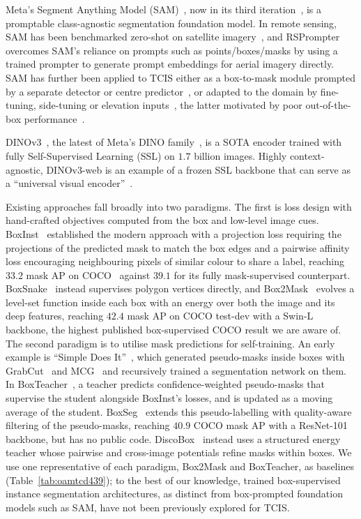 \documentclass[remotesensing,article,submit,moreauthors]{Definitions/mdpi}
\begin{document}
Meta's Segment Anything Model (SAM)~\cite{sam}, now in its third iteration~\cite{sam3}, is a promptable class-agnostic segmentation foundation model. In remote sensing, SAM has been benchmarked zero-shot on satellite imagery~\cite{ren2024space}, and RSPrompter~\cite{rsprompter} overcomes SAM's reliance on prompts such as points/boxes/masks by using a trained prompter to generate prompt embeddings for aerial imagery directly. 
SAM has further been applied to TCIS either as a box-to-mask module prompted by a separate detector or centre predictor~\cite{fmsam,chen2025zeroshot,treepseco}, or adapted to the domain by fine-tuning, side-tuning or elevation inputs~\cite{teng2025,treesam,ginkgo}, the latter motivated by poor out-of-the-box performance~\cite{teng2025,treesam}.


DINOv3~\cite{dinov3}, the latest of Meta's DINO family~\cite{dino,dinov2}, is a SOTA encoder trained with fully Self-Supervised Learning (SSL) on $1.7$ billion images. Highly context-agnostic, DINOv3-web is an example of a frozen SSL backbone that can serve as a ``universal visual encoder''~\cite{dinov3}.



Existing approaches fall broadly into two paradigms. The first is loss design with hand-crafted objectives computed from the box and low-level image cues. BoxInst~\cite{boxinst} established the modern approach with a projection loss requiring the projections of the predicted mask to match the box edges and a pairwise affinity loss encouraging neighbouring pixels of similar colour to share a label, reaching $33.2$ mask AP on COCO~\cite{coco} against $39.1$ for its fully mask-supervised counterpart. BoxSnake~\cite{boxsnake} instead supervises polygon vertices directly, and Box2Mask~\cite{box2mask} evolves a level-set function inside each box with an energy over both the image and its deep features, reaching $42.4$ mask AP on COCO test-dev with a Swin-L~\cite{swin} backbone, the highest published box-supervised COCO result we are aware of. The second paradigm is to utilise mask predictions for self-training. An early example is ``Simple Does It''~\cite{khoreva2017}, which generated pseudo-masks inside boxes with GrabCut~\cite{rother2004} and MCG~\cite{pont2017mcg} and recursively trained a segmentation network on them. In BoxTeacher~\cite{boxteacher}, a teacher predicts confidence-weighted pseudo-masks that supervise the student alongside BoxInst's losses, and is updated as a moving average of the student. BoxSeg~\cite{boxseg} extends this pseudo-labelling with quality-aware filtering of the pseudo-masks, reaching $40.9$ COCO mask AP with a ResNet-101 backbone, but has no public code. DiscoBox~\cite{discobox} instead uses a structured energy teacher whose pairwise and cross-image potentials refine masks within boxes. We use one representative of each paradigm, Box2Mask and BoxTeacher, as baselines (Table~\ref{tab:oamtcd439}); to the best of our knowledge, trained box-supervised instance segmentation architectures, as distinct from box-prompted foundation models such as SAM, have not been previously explored for TCIS.
\end{document}
